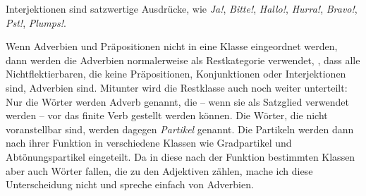 \documentclass[ number=45
			   ,series=eotms
			   ,printondemand
			  ]{langsci}
\begin{document}
{Interjektionen sind satzwertige Ausdrücke, wie \emph{Ja!}, \emph{Bitte!}, \emph{Hallo!},
\emph{Hurra!}, \emph{Bravo!}, \emph{Pst!}, \emph{Plumps!}.

Wenn Adverbien und Präpositionen nicht in eine Klasse eingeordnet werden, dann werden die Adverbien
normalerweise als Restkategorie verwendet, \dash, dass alle Nichtflektierbaren, die keine
Präpositionen, Konjunktionen oder Interjektionen sind, Adverbien sind.  Mitunter wird die Restklasse
auch noch weiter unterteilt: Nur die Wörter werden Adverb genannt, die -- wenn sie als Satzglied
verwendet werden -- vor das finite Verb gestellt werden können. Die Wörter, die nicht voranstellbar
sind, werden dagegen \emph{Partikel} genannt. Die Partikeln
werden dann nach ihrer Funktion in verschiedene Klassen wie Gradpartikel und
Abtönungspartikel eingeteilt. Da in diese nach der Funktion bestimmten
Klassen aber auch Wörter fallen, die zu den Adjektiven zählen, mache ich diese Unterscheidung nicht
und spreche einfach von Adverbien.


}
\end{document}
